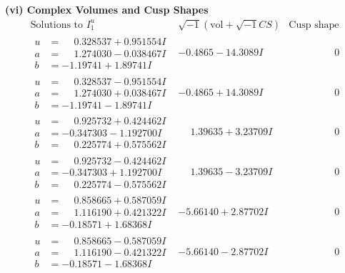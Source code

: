 \documentclass[1p]{elsarticle_modified}
\theoremstyle{definition}
\newcommand{\I}{\sqrt{-1}}
\begin{document}
\newpage\flushleft \textbf{(vi) Complex Volumes and Cusp Shapes}
$$\begin{array}{c|c|c}  
\text{Solutions to }I^u_{1}& \I (\text{vol} + \sqrt{-1}CS) & \text{Cusp shape}\\
 \hline 
\begin{aligned}
u &= \phantom{-}0.328537 + 0.951554 I \\
a &= \phantom{-}1.274030 - 0.038467 I \\
b &= -1.19741 + 1.89741 I\end{aligned}
 & -0.4865 - 14.3089 I & \phantom{-0.000000 } 0 \\ \hline\begin{aligned}
u &= \phantom{-}0.328537 - 0.951554 I \\
a &= \phantom{-}1.274030 + 0.038467 I \\
b &= -1.19741 - 1.89741 I\end{aligned}
 & -0.4865 + 14.3089 I & \phantom{-0.000000 } 0 \\ \hline\begin{aligned}
u &= \phantom{-}0.925732 + 0.424462 I \\
a &= -0.347303 - 1.192700 I \\
b &= \phantom{-}0.225774 + 0.575562 I\end{aligned}
 & \phantom{-}1.39635 + 3.23709 I & \phantom{-0.000000 } 0 \\ \hline\begin{aligned}
u &= \phantom{-}0.925732 - 0.424462 I \\
a &= -0.347303 + 1.192700 I \\
b &= \phantom{-}0.225774 - 0.575562 I\end{aligned}
 & \phantom{-}1.39635 - 3.23709 I & \phantom{-0.000000 } 0 \\ \hline\begin{aligned}
u &= \phantom{-}0.858665 + 0.587059 I \\
a &= \phantom{-}1.116190 + 0.421322 I \\
b &= -0.18571 + 1.68368 I\end{aligned}
 & -5.66140 + 2.87702 I & \phantom{-0.000000 } 0 \\ \hline\begin{aligned}
u &= \phantom{-}0.858665 - 0.587059 I \\
a &= \phantom{-}1.116190 - 0.421322 I \\
b &= -0.18571 - 1.68368 I\end{aligned}
 & -5.66140 - 2.87702 I & \phantom{-0.000000 } 0 \\ \hline\begin{aligned}

\end{aligned}
\end{array}$$
\end{document}
